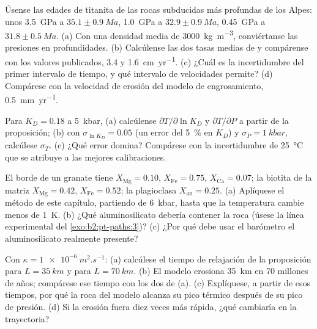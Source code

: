 \begin{exercise}[$\star\star$]\label{exo:b2:pt-paths:8}
Úsense las edades de titanita de las rocas subducidas más profundas de los Alpes: unos \qty{3.5}{GPa} a
$35.1 \pm \qty{0.9}{Ma}$, \qty{1.0}{GPa} a $32.9 \pm \qty{0.9}{Ma}$, \qty{0.45}{GPa} a
$31.8 \pm \qty{0.5}{Ma}$. (a) Con una densidad media de \qty{3000}{kg.m^{-3}}, conviértanse las
presiones en profundidades. (b) Calcúlense las dos tasas medias de  y compárense con los
valores publicados, 3.4 y \qty{1.6}{cm.yr^{-1}}. (c) ¿Cuál es la incertidumbre del primer intervalo
de tiempo, y qué intervalo de velocidades permite? (d) Compárese con la velocidad de erosión
del modelo de engrosamiento, \qty{0.5}{mm.yr^{-1}}.
\end{exercise}

\begin{exercise}[$\star\star$]\label{exo:b2:pt-paths:9}
Para $K_D = 0.18$ a \qty{5}{kbar}, (a) calcúlense $\partial T/\partial\ln K_D$ y
$\partial T/\partial P$ a partir de la proposición; (b) con $\sigma_{\ln K_D} = 0.05$ (un
error del \qty{5}{\percent} en $K_D$) y $\sigma_P = \qty{1}{kbar}$, calcúlese $\sigma_T$.
(c) ¿Qué error domina? Compárese con la incertidumbre de \qty{25}{\celsius} que se atribuye a
las mejores calibraciones.
\end{exercise}

\begin{exercise}[$\star\star\star$]\label{exo:b2:pt-paths:10}
El borde de un granate tiene $X_{\text{Mg}} = 0.10$, $X_{\text{Fe}} = 0.75$, $X_{\text{Ca}} = 0.07$;
la biotita de la matriz $X_{\text{Mg}} = 0.42$, $X_{\text{Fe}} = 0.52$; la plagioclasa
$X_{\text{an}} = 0.25$. (a) Aplíquese el método de este capítulo, partiendo de \qty{6}{kbar},
hasta que la temperatura cambie menos de \qty{1}{K}. (b) ¿Qué aluminosilicato debería contener
la roca (úsese la línea experimental del \cref{exo:b2:pt-paths:3})? (c) ¿Por qué debe usar el barómetro
el aluminosilicato realmente presente?
\end{exercise}

\begin{exercise}[$\star\star\star$]\label{exo:b2:pt-paths:11}
Con $\kappa = \qty{1e-6}{m^2.s^{-1}}$: (a) calcúlese el tiempo de relajación de la
proposición para $L = \qty{35}{km}$ y para $L = \qty{70}{km}$. (b) El modelo erosiona
\qty{35}{km} en 70 millones de años; compárese ese tiempo con los dos de (a). (c) Explíquese,
a partir de esos tiempos, por qué la roca del modelo alcanza su pico térmico después de su pico de
presión. (d) Si la erosión fuera diez veces más rápida, ¿qué cambiaría en la trayectoria?
\end{exercise}

